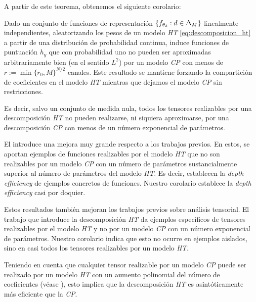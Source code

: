A partir de este teorema, obtenemos el siguiente corolario:

\begin{corolario} \label{corol:corol_principal}

Dado un conjunto de funciones de representación $\{f_{\theta_d}: d \in \Delta_{M} \}$ linealmente independientes, aleatorizando los pesos de un modelo \textit{HT} \eqref{eq:descomposicion_ht} a partir de una distribución de probabilidad continua, induce funciones de puntuación $h_y$ que con probabilidad uno no pueden ser aproximadas arbitrariamente bien (en el sentido $L^2$) por un modelo \textit{CP} con menos de $r := \min \{r_0, M \}^{N/2}$ canales. Este resultado se mantiene forzando la compartición de coeficientes en el modelo \textit{HT} mientras que dejamos el modelo \textit{CP} sin restricciones.

\end{corolario}

Es decir, salvo un conjunto de medida nula, todos los tensores realizables por una descomposición \textit{HT} no pueden realizarse, ni siquiera aproximarse, por una descomposición \textit{CP} con menos de un número exponencial de parámetros.

El  introduce una mejora muy grande respecto a los trabajos previos. En estos, se aportan ejemplos de funciones realizables por el modelo \textit{HT} que no son realizables por un modelo \textit{CP} con un número de parámetros sustancialmente superior al número de parámetros del modelo \textit{HT}. Es decir, establecen la \textit{depth efficiency} de ejemplos concretos de funciones. Nuestro corolario establece la \textit{depth efficiency} casi por doquier.

Estos resultados también mejoran los trabajos previos sobre análisis tensorial. El trabajo que introduce la descomposición \textit{HT} \cite{matematicas:descomposicion_ht} da ejemplos específicos de tensores realizables por el modelo \textit{HT} y no por un modelo \textit{CP} con un número exponencial de parámetros. Nuestro corolario indica que esto no ocurre en ejemplos aislados, sino en casi todos los tensores realizables por un modelo \textit{HT}.

Teniendo en cuenta que cualquier tensor realizable por un modelo \textit{CP} puede ser realizado por un modelo \textit{HT} con un aumento polinomial del número de coeficientes (véase ), esto implica que la descomposición \textit{HT} es asintóticamente más eficiente que la \textit{CP}.


